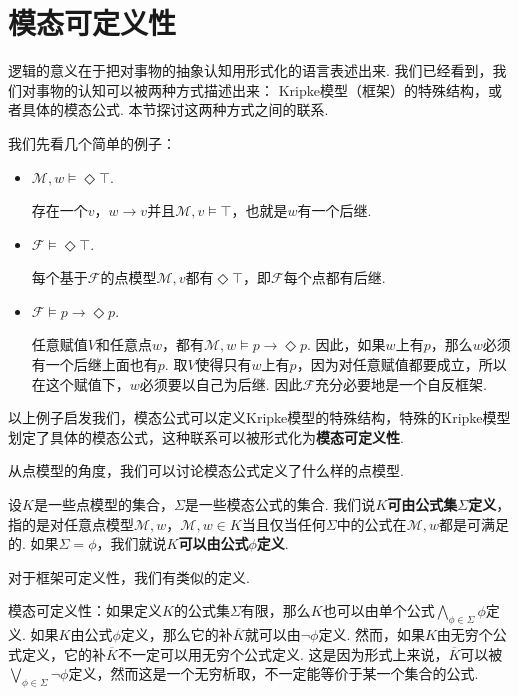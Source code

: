 \section{模态可定义性}

逻辑的意义在于把对事物的抽象认知用形式化的语言表述出来. 我们已经看到，我们对事物的认知可以被两种方式描述出来： Kripke模型（框架）的特殊结构，或者具体的模态公式. 本节探讨这两种方式之间的联系. 

我们先看几个简单的例子：
\begin{example}
\begin{itemize}
    \item $\mathcal M,w\vDash\Diamond\top$.

    存在一个$v$，$w\to v$并且$\mathcal M,v\vDash\top$，也就是$w$有一个后继.

    \item $\mathcal F\vDash\Diamond \top$.
    
    每个基于$\mathcal F$的点模型$\mathcal M,v$都有$\Diamond \top$，即$\mathcal F$每个点都有后继.

    \item $\mathcal F\vDash p\to\Diamond p$.
    
    任意赋值$V$和任意点$w$，都有$\mathcal M,w\vDash p\to\Diamond p$. 因此，如果$w$上有$p$，那么$w$必须有一个后继上面也有$p$. 取$V$使得只有$w$上有$p$，因为对任意赋值都要成立，所以在这个赋值下，$w$必须要以自己为后继. 因此$\mathcal F$充分必要地是一个自反框架.
    \end{itemize}
\end{example}

以上例子启发我们，模态公式可以定义Kripke模型的特殊结构，特殊的Kripke模型划定了具体的模态公式，这种联系可以被形式化为\textbf{模态可定义性}.

从点模型的角度，我们可以讨论模态公式定义了什么样的点模型. 

\begin{definition}[点模型可定义性]
设$K$是一些点模型的集合，$\Sigma$是一些模态公式的集合. 我们说\textbf{$K$可由公式集$\Sigma$定义}，指的是对任意点模型$\mathcal M,w$，$\mathcal M,w\in K$当且仅当任何$\Sigma$中的公式在$\mathcal M,w$都是可满足的. 如果$\Sigma={\phi}$，我们就说\textbf{$K$可以由公式$\phi$定义}. 
\end{definition}
对于框架可定义性，我们有类似的定义.

模态可定义性：如果定义$K$的公式集$\Sigma$有限，那么$K$也可以由单个公式$\bigwedge_{\phi\in\Sigma}\phi$定义. 如果$K$由公式$\phi$定义，那么它的补$\overline{K}$就可以由$\neg\phi$定义. 然而，如果$K$由无穷个公式定义，它的补$\overline{K}$不一定可以用无穷个公式定义. 这是因为形式上来说，$\overline{K}$可以被$\bigvee_{\phi\in\Sigma}\neg\phi$定义，然而这是一个无穷析取，不一定能等价于某一个集合的公式.

